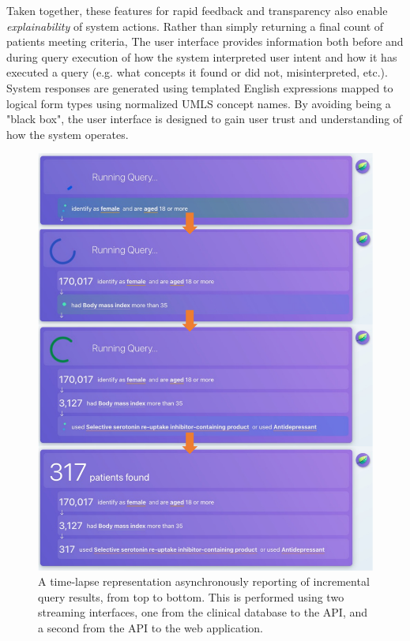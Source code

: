 \documentclass[../main.tex]{subfiles}
\begin{document}
Taken together, these features for rapid feedback and transparency also enable \textit{explainability} of system actions. Rather than simply returning a final count of patients meeting criteria, The user interface provides information both before and during query execution of how the system interpreted user intent and how it has executed a query (e.g. what concepts it found or did not, misinterpreted, etc.). System responses are generated using templated English expressions mapped to logical form types using normalized UMLS concept names. By avoiding being a "black box", the user interface is designed to gain user trust and understanding of how the system operates.

\begin{figure}[H]
  \centering
  \includegraphics[scale=0.65]{Figures/8_web_application/leafai_query_progress.pdf}  
  \caption{A time-lapse representation asynchronously reporting of incremental query results, from top to bottom. This is performed using two streaming interfaces, one from the clinical database to the API, and a second from the API to the web application.}
\label{fig_leafai_query_progress}
\end{figure}
\end{document}
